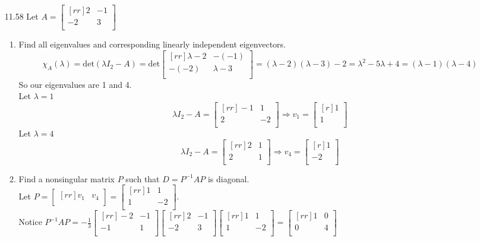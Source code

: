 \documentclass[12pt]{article}
\theoremstyle{definition}
\theoremstyle{plain}
\begin{document}
\begin{enumerate}
\item[11.58]Let $A=\begin{bmatrix}[rr]2&-1\\-2&3\\\end{bmatrix}$
	\begin{enumerate}
	\item Find all eigenvalues and corresponding linearly independent eigenvectors.
	\[ \chi_A (\lambda) = \mathrm{det}(\lambda I_2-A) = \mathrm{det}\begin{bmatrix}[rr]\lambda - 2&-(-1)\\-(-2) & \lambda - 3\\\end{bmatrix} = (\lambda - 2)(\lambda - 3) - 2 = \lambda^2-5\lambda + 4=(\lambda - 1)(\lambda - 4) \]
	So our eigenvalues are 1 and 4.\\
	Let $\lambda=1$
	\[ \lambda I_2 - A = \begin{bmatrix}[rr]-1&1\\2&-2\\\end{bmatrix} \Rightarrow v_1=\begin{bmatrix}[r]1\\1\\\end{bmatrix} \]
	Let $\lambda=4$
	\[ \lambda I_2 - A=\begin{bmatrix}[rr]2&1\\2&1\\\end{bmatrix} \Rightarrow v_4=\begin{bmatrix}[r]1\\-2\\\end{bmatrix} \]
	\item Find a nonsingular matrix $P$ such that $D=P^{-1}AP$ is diagonal. \\
	Let $P=\begin{bmatrix}[rr]v_1&v_4\\\end{bmatrix}=\begin{bmatrix}[rr]1&1\\1&-2\\\end{bmatrix}$.\\
	Notice $P^{-1}AP=-\frac{1}{3}\begin{bmatrix}[rr]-2&-1\\-1&1\\\end{bmatrix}\begin{bmatrix}[rr]2&-1\\-2&3\\\end{bmatrix}\begin{bmatrix}[rr]1&1\\1&-2\\\end{bmatrix}=\begin{bmatrix}[rr]1&0\\0&4\\\end{bmatrix}$

\end{enumerate}
\end{enumerate}
\end{document}
